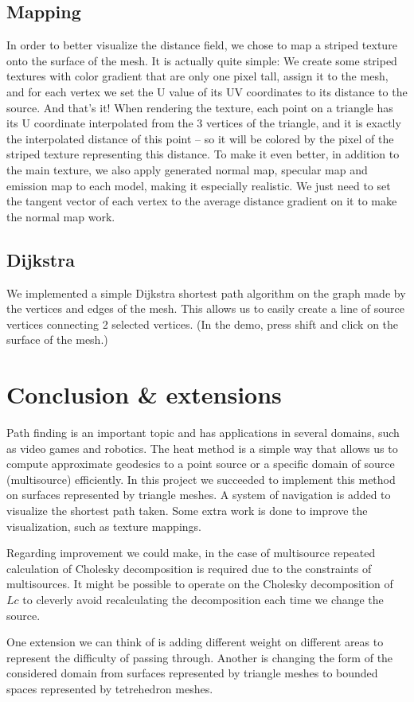 \documentclass[a4paper,12pt,twoside]{article}
\begin{document}
\subsection{Mapping}

In order to better visualize the distance field, we chose to map a striped texture onto the surface of the mesh. It is actually quite simple: We create some striped textures with color gradient that are only one pixel tall, assign it to the mesh, and for each vertex we set the U value of its UV coordinates to its distance to the source. And that’s it! When rendering the texture, each point on a triangle has its U coordinate interpolated from the 3 vertices of the triangle, and it is exactly the interpolated distance of this point – so it will be colored by the pixel of the striped texture representing this distance.
To make it even better, in addition to the main texture, we also apply generated normal map, specular map and emission map to each model, making it especially realistic. We just need to set the tangent vector of each vertex to the average distance gradient on it to make the normal map work.


\subsection{Dijkstra}
We implemented a simple Dijkstra shortest path algorithm on the graph made by the vertices and edges of the mesh. This allows us to easily create a line of source vertices connecting 2 selected vertices. (In the demo, press shift and click on the surface of the mesh.)


\section{Conclusion \& extensions}
Path finding is an important topic and has applications in several domains, such as video games and robotics. The heat method is a simple way that allows us to compute approximate geodesics to a point source or a specific domain of source (multisource) efficiently. In this project we succeeded to implement this method on surfaces represented by triangle meshes. A system of navigation is added to visualize the shortest path taken. Some extra work is done to improve the visualization, such as texture mappings.

Regarding improvement we could make, in the case of multisource repeated calculation of Cholesky decomposition is required due to the constraints of multisources. It might be possible to operate on the Cholesky decomposition of $Lc$ to cleverly avoid recalculating the decomposition each time we change the source.

One extension we can think of is adding different weight on different areas to represent the difficulty of passing through. Another is changing the form of the considered domain from surfaces represented by triangle meshes to bounded spaces represented by tetrehedron meshes.
\end{document}
